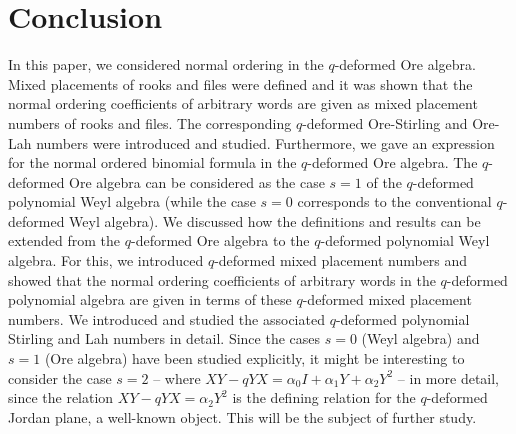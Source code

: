 \documentclass[10pt]{amsart}
\begin{document}
\section{Conclusion}\label{Conclusion}
In this paper, we considered normal ordering in the $q$-deformed Ore algebra. Mixed placements of rooks and files were defined and it was shown that the normal ordering coefficients of arbitrary words are given as mixed placement numbers of rooks and files. The corresponding $q$-deformed Ore-Stirling and Ore-Lah numbers were introduced and studied. Furthermore, we gave an expression for the normal ordered binomial formula in the $q$-deformed Ore algebra. The $q$-deformed Ore algebra can be considered as the case $s=1$ of the $q$-deformed polynomial Weyl algebra (while the case $s=0$ corresponds to the conventional $q$-deformed Weyl algebra). We discussed how the definitions and results can be extended from the $q$-deformed Ore algebra to the $q$-deformed polynomial Weyl algebra. For this, we introduced $q$-deformed mixed placement numbers and showed that the normal ordering coefficients of arbitrary words in the $q$-deformed polynomial algebra are given in terms of these $q$-deformed mixed placement numbers. We introduced and studied the associated $q$-deformed polynomial Stirling and Lah numbers in detail. Since the cases $s=0$ (Weyl algebra) and $s=1$ (Ore algebra) have been studied explicitly, it might be interesting to consider the case $s=2$ -- where $XY-qYX=\alpha_0 I + \alpha_1 Y+\alpha_2Y^2$ -- in more detail, since the relation $XY-qYX =\alpha_2Y^2$ is the defining relation for the $q$-deformed Jordan plane, a well-known object. This will be the subject of further study.
\end{document}
